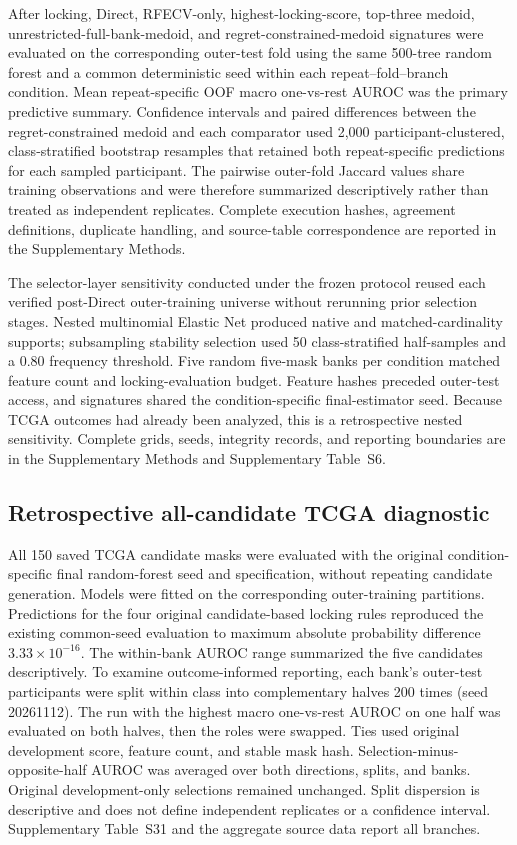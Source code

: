 After locking, Direct, RFECV-only, highest-locking-score, top-three medoid, unrestricted-full-bank-medoid, and regret-constrained-medoid signatures were evaluated on the corresponding outer-test fold using the same 500-tree random forest and a common deterministic seed within each repeat--fold--branch condition. Mean repeat-specific OOF macro one-vs-rest AUROC was the primary predictive summary. Confidence intervals and paired differences between the regret-constrained medoid and each comparator used 2,000 participant-clustered, class-stratified bootstrap resamples that retained both repeat-specific predictions for each sampled participant. The pairwise outer-fold Jaccard values share training observations and were therefore summarized descriptively rather than treated as independent replicates. Complete execution hashes, agreement definitions, duplicate handling, and source-table correspondence are reported in the Supplementary Methods.

The selector-layer sensitivity conducted under the frozen protocol reused each verified post-Direct outer-training universe without rerunning prior selection stages. Nested multinomial Elastic Net produced native and matched-cardinality supports; subsampling stability selection used 50 class-stratified half-samples and a 0.80 frequency threshold. Five random five-mask banks per condition matched feature count and locking-evaluation budget. Feature hashes preceded outer-test access, and signatures shared the condition-specific final-estimator seed. Because TCGA outcomes had already been analyzed, this is a retrospective nested sensitivity. Complete grids, seeds, integrity records, and reporting boundaries are in the Supplementary Methods and Supplementary Table~S6.

\subsection{Retrospective all-candidate TCGA diagnostic}

All 150 saved TCGA candidate masks were evaluated with the original condition-specific final random-forest seed and specification, without repeating candidate generation. Models were fitted on the corresponding outer-training partitions. Predictions for the four original candidate-based locking rules reproduced the existing common-seed evaluation to maximum absolute probability difference $3.33\times10^{-16}$. The within-bank AUROC range summarized the five candidates descriptively. To examine outcome-informed reporting, each bank's outer-test participants were split within class into complementary halves 200 times (seed 20261112). The run with the highest macro one-vs-rest AUROC on one half was evaluated on both halves, then the roles were swapped. Ties used original development score, feature count, and stable mask hash. Selection-minus-opposite-half AUROC was averaged over both directions, splits, and banks. Original development-only selections remained unchanged. Split dispersion is descriptive and does not define independent replicates or a confidence interval. Supplementary Table~S31 and the aggregate source data report all branches.

